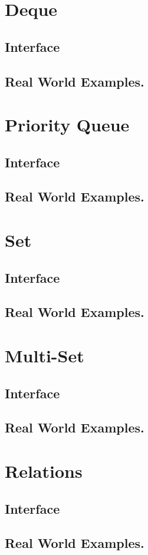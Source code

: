 \documentclass[12pt, letterpaper]{book}
\begin{document}
\section{Deque}
	\subsection{Interface}
	\subsection{Real World Examples.}
\section{Priority Queue}
	\subsection{Interface}
	\subsection{Real World Examples.}
\section{Set}
	\subsection{Interface}
	\subsection{Real World Examples.}
\section{Multi-Set}
	\subsection{Interface}
	\subsection{Real World Examples.}
\section{Relations}
	\subsection{Interface}
	\subsection{Real World Examples.}
\end{document}

